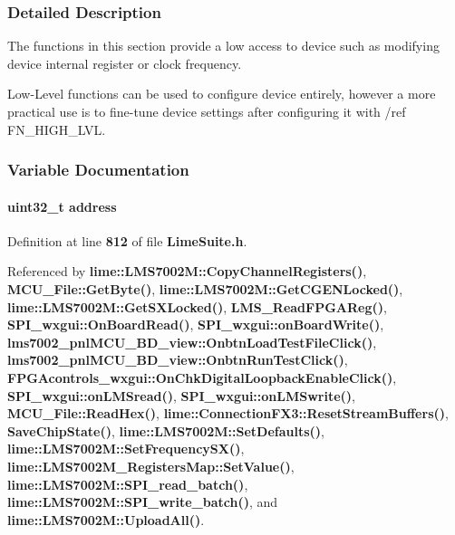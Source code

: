 \subsubsection{Detailed Description}
The functions in this section provide a low access to device such as modifying device internal register or clock frequency. 

Low-\/\+Level functions can be used to configure device entirely, however a more practical use is to fine-\/tune device settings after configuring it with /ref F\+N\+\_\+\+H\+I\+G\+H\+\_\+\+L\+VL. 

\subsubsection{Variable Documentation}
\paragraph[{address}]{\setlength{\rightskip}{0pt plus 5cm}uint32\+\_\+t address}\label{group__FN__LOW__LVL_gac0d31ca829f934cccd89f8054e02773e}


Definition at line {\bf 812} of file {\bf Lime\+Suite.\+h}.



Referenced by {\bf lime\+::\+L\+M\+S7002\+M\+::\+Copy\+Channel\+Registers()}, {\bf M\+C\+U\+\_\+\+File\+::\+Get\+Byte()}, {\bf lime\+::\+L\+M\+S7002\+M\+::\+Get\+C\+G\+E\+N\+Locked()}, {\bf lime\+::\+L\+M\+S7002\+M\+::\+Get\+S\+X\+Locked()}, {\bf L\+M\+S\+\_\+\+Read\+F\+P\+G\+A\+Reg()}, {\bf S\+P\+I\+\_\+wxgui\+::\+On\+Board\+Read()}, {\bf S\+P\+I\+\_\+wxgui\+::on\+Board\+Write()}, {\bf lms7002\+\_\+pnl\+M\+C\+U\+\_\+\+B\+D\+\_\+view\+::\+Onbtn\+Load\+Test\+File\+Click()}, {\bf lms7002\+\_\+pnl\+M\+C\+U\+\_\+\+B\+D\+\_\+view\+::\+Onbtn\+Run\+Test\+Click()}, {\bf F\+P\+G\+Acontrols\+\_\+wxgui\+::\+On\+Chk\+Digital\+Loopback\+Enable\+Click()}, {\bf S\+P\+I\+\_\+wxgui\+::on\+L\+M\+Sread()}, {\bf S\+P\+I\+\_\+wxgui\+::on\+L\+M\+Swrite()}, {\bf M\+C\+U\+\_\+\+File\+::\+Read\+Hex()}, {\bf lime\+::\+Connection\+F\+X3\+::\+Reset\+Stream\+Buffers()}, {\bf Save\+Chip\+State()}, {\bf lime\+::\+L\+M\+S7002\+M\+::\+Set\+Defaults()}, {\bf lime\+::\+L\+M\+S7002\+M\+::\+Set\+Frequency\+S\+X()}, {\bf lime\+::\+L\+M\+S7002\+M\+\_\+\+Registers\+Map\+::\+Set\+Value()}, {\bf lime\+::\+L\+M\+S7002\+M\+::\+S\+P\+I\+\_\+read\+\_\+batch()}, {\bf lime\+::\+L\+M\+S7002\+M\+::\+S\+P\+I\+\_\+write\+\_\+batch()}, and {\bf lime\+::\+L\+M\+S7002\+M\+::\+Upload\+All()}.

